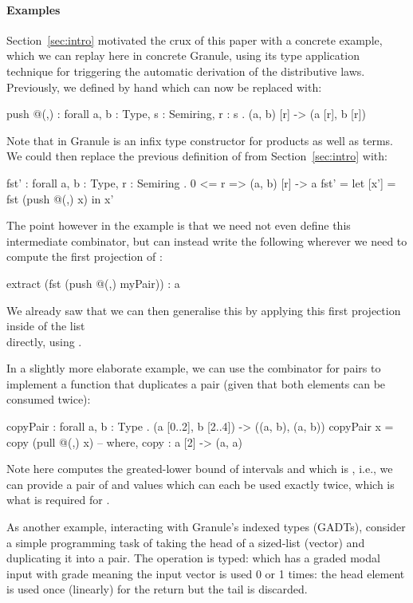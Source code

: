  \paragraph{Examples}
 Section~\ref{sec:intro} motivated the crux of this paper with a
 concrete example, which we can replay here in concrete Granule, using
 its type application technique for triggering the automatic derivation
 of the distributive laws. Previously, we defined  by
 hand which can now be replaced with:
 \begin{granule}
 push @(,) : forall {a, b : Type, s : Semiring, r : s} . (a, b) [r] -> (a [r], b [r])
 \end{granule}
 Note that in Granule \granin{(,)} is an infix type constructor for products as well as terms. We could then replace the previous definition of  from
 Section~\ref{sec:intro} with:
 \begin{granule}
 fst' : forall {a, b : Type, r : Semiring} . {0 <= r} => (a, b) [r] -> a
 fst' = let [x'] = fst (push @(,) x) in x'
 \end{granule}
 The point however in the example is that we need not even define this
 intermediate combinator, but can instead write the following
 wherever we need to compute the first projection
 of :
 \begin{granule}
 extract (fst (push @(,) myPair)) : a
 \end{granule}
 We already saw that we can then generalise this by applying
 this first projection inside of the list \\  directly, using .
 
 In a slightly more elaborate example, we can use the  combinator
 for pairs to implement a function that duplicates a pair (given that both elements
 can be consumed twice):
 \begin{granule}
 copyPair : forall {a, b : Type} . (a [0..2], b [2..4]) -> ((a, b), (a, b))
 copyPair x = copy (pull @(,) x) -- where, copy : a [2] -> (a, a)
 \end{granule}
 Note  here computes the greated-lower
 bound of intervals  and  which is
 , i.e., we can provide a pair of  and 
 values which can each be used exactly twice, which is what is required
 for .
 
 As another example, interacting with Granule's indexed types
 (GADTs), consider a simple programming task of taking the head of a sized-list (vector)
 and duplicating it into a pair. The  operation
 is typed:  which has a graded modal input with grade  meaning
 the input vector is used 0 or 1 times:
 the head element is used once (linearly) for the return
 but the tail is discarded.
 
